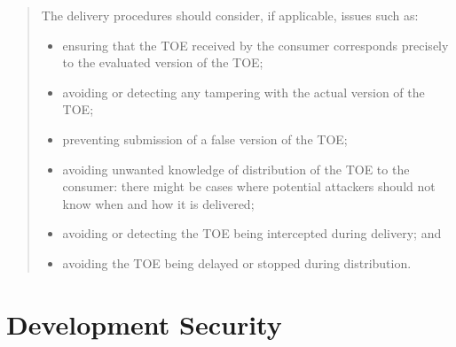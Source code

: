 \begin{quote}
    The delivery procedures should consider, if applicable, issues such as:
    \begin{itemize}
        \item ensuring that the TOE received by the consumer corresponds precisely to the evaluated
            version of the TOE;
        \item avoiding or detecting any tampering with the actual version of the TOE;
        \item preventing submission of a false version of the TOE;
        \item avoiding unwanted knowledge of distribution of the TOE to the consumer: there might be
            cases where potential attackers should not know when and how it is delivered;
        \item avoiding or detecting the TOE being intercepted during delivery; and
        \item avoiding the TOE being delayed or stopped during distribution.
    \end{itemize}
\end{quote}


\section{Development Security}

